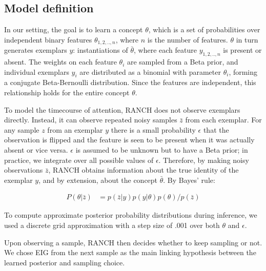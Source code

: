 \documentclass[10pt, letterpaper]{article}
\begin{document}
\hypertarget{model-definition}{%
\subsection{Model definition}\label{model-definition}}

In our setting, the goal is to learn a concept \(\theta\), which is a
set of probabilities over independent binary features
\(\theta_{1,2,..,n}\), where \(n\) is the number of features. \(\theta\)
in turn generates exemplars \(y\): instantiations of \(\bar{\theta}\),
where each feature \(y_{1,2,..,n}\) is present or absent. The weights on
each feature \(\theta_i\) are sampled from a Beta prior, and individual
exemplars \(y_i\) are distributed as a binomial with parameter
\(\theta_i\), forming a conjugate Beta-Bernoulli distribution. Since the
features are independent, this relationship holds for the entire concept
\(\theta\).

To model the timecourse of attention, RANCH does not observe exemplars
directly. Instead, it can observe repeated noisy samples \(\bar{z}\)
from each exemplar. For any sample \(z\) from an exemplar \(y\) there is
a small probability \(\epsilon\) that the observation is flipped and the
feature is seen to be present when it was actually absent or vice versa.
\(\epsilon\) is assumed to be unknown but to have a Beta prior; in
practice, we integrate over all possible values of \(\epsilon\).
Therefore, by making noisy observations \(\bar{z}\), RANCH obtains
information about the true identity of the exemplar \(y\), and by
extension, about the concept \(\bar{\theta}\). By Bayes' rule:

\begin{eqnarray}
P(\theta|\bar{z}) &= p(\bar{z}|y) p(y|\theta) p(\theta) / p(\bar{z})
\end{eqnarray}

To compute approximate posterior probability distributions during
inference, we used a discrete grid approximation with a step size of
.001 over both \(\theta\) and \(\epsilon\).

Upon observing a sample, RANCH then decides whether to keep sampling or
not. We chose EIG from the next sample as the main linking hypothesis
between the learned posterior and sampling choice.
\end{document}
